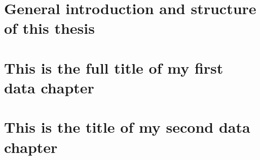 \documentclass[12pt, a4paper, twoside, openright, final]{report}
\begin{document}

\tableofcontents 
\listoffigures 
\listoftables 
    \clearpage \null \newpage 
\listofacronyms
    \clearpage \null \newpage

 

\chapter{General introduction and structure of this thesis
        }\label{chap:gen-intro}


\chapter{This is the full title of my first data chapter
        }\label{chap:1st-data}
\begin{framed}
\lipsum[3] %
\end{framed}\newpage


\chapter{This is the title of my second data chapter
        }\label{chap:2nd-data}

    
\end{document}

